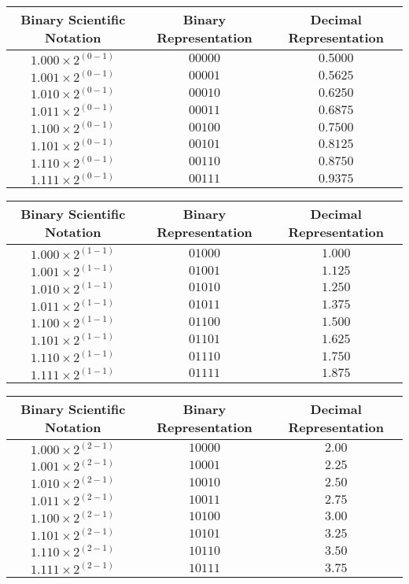 \documentclass[12pt, letterpaper]{article}
\begin{document}
\begin{center}
\begin{tabular}{ |c|c|c| } 
 \hline
 Binary Scientific Notation & Binary Representation & Decimal Representation \\ 
 \hline
 $1.000 \times 2^{(0-1)}$ & $00000$ & $0.5000$ \\ 
 \hline
 $1.001 \times 2^{(0-1)}$ & $00001$ & $0.5625$ \\ 
 \hline
 $1.010 \times 2^{(0-1)}$ & $00010$ & $0.6250$ \\ 
 \hline
 $1.011 \times 2^{(0-1)}$ & $00011$ & $0.6875$ \\ 
 \hline
 $1.100 \times 2^{(0-1)}$ & $00100$ & $0.7500$ \\ 
 \hline
 $1.101 \times 2^{(0-1)}$ & $00101$ & $0.8125$ \\ 
 \hline
 $1.110 \times 2^{(0-1)}$ & $00110$ & $0.8750$ \\ 
 \hline
 $1.111 \times 2^{(0-1)}$ & $00111$ & $0.9375$ \\ 
 \hline
\end{tabular}
\begin{tabular}{ |c|c|c| } 
 \hline
 Binary Scientific Notation & Binary Representation & Decimal Representation \\ 
 \hline
 $1.000 \times 2^{(1-1)}$ & $01000$ & $1.000$ \\ 
 \hline
 $1.001 \times 2^{(1-1)}$ & $01001$ & $1.125$ \\ 
 \hline
 $1.010 \times 2^{(1-1)}$ & $01010$ & $1.250$ \\ 
 \hline
 $1.011 \times 2^{(1-1)}$ & $01011$ & $1.375$ \\ 
 \hline
 $1.100 \times 2^{(1-1)}$ & $01100$ & $1.500$ \\ 
 \hline
 $1.101 \times 2^{(1-1)}$ & $01101$ & $1.625$ \\ 
 \hline
 $1.110 \times 2^{(1-1)}$ & $01110$ & $1.750$ \\ 
 \hline
 $1.111 \times 2^{(1-1)}$ & $01111$ & $1.875$ \\ 
 \hline
\end{tabular}
\begin{tabular}{ |c|c|c| } 
 \hline
 Binary Scientific Notation & Binary Representation & Decimal Representation \\ 
 \hline
 $1.000 \times 2^{(2-1)}$ & $10000$ & $2.00$ \\ 
 \hline
 $1.001 \times 2^{(2-1)}$ & $10001$ & $2.25$ \\ 
 \hline
 $1.010 \times 2^{(2-1)}$ & $10010$ & $2.50$ \\ 
 \hline
 $1.011 \times 2^{(2-1)}$ & $10011$ & $2.75$ \\ 
 \hline
 $1.100 \times 2^{(2-1)}$ & $10100$ & $3.00$ \\ 
 \hline
 $1.101 \times 2^{(2-1)}$ & $10101$ & $3.25$ \\ 
 \hline
 $1.110 \times 2^{(2-1)}$ & $10110$ & $3.50$ \\ 
 \hline
 $1.111 \times 2^{(2-1)}$ & $10111$ & $3.75$ \\ 
 \hline
\end{tabular}
\end{center}
\end{document}
